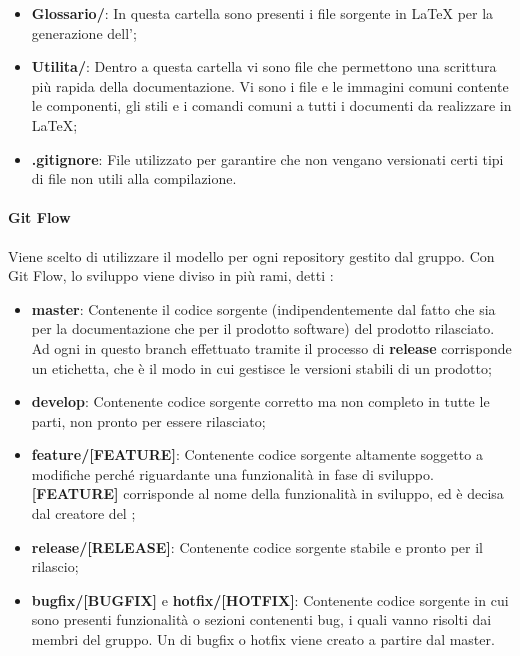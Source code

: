 \begin{itemize}
\begin{itemize}
		Per ogni incontro viene redatto un verbale che è presente in un'unica cartella;
		\item \textbf{StudioDiFattibilita/}: All'interno di questa cartella sono presenti i file sorgente in \LaTeX{} per la generazione dell'\SdF{};
		\item \textbf{NormeDiProgetto/}: Dentro a questa cartella sono presenti i file sorgente in \LaTeX{} per la generazione dell'\NdP{}.
	\end{itemize}	
	\item \textbf{Glossario/}: In questa cartella sono presenti i file sorgente in \LaTeX{} per la generazione dell'\Glossario{};
	\item \textbf{Utilita/}: Dentro a questa cartella vi sono file che permettono una scrittura più rapida della documentazione.
	Vi sono i file e le immagini comuni contente le componenti, gli stili e i comandi comuni a tutti i documenti da realizzare in \LaTeX{};
	\item \textbf{.gitignore}: File utilizzato per garantire che non vengano versionati certi tipi di file non utili alla compilazione.
\end{itemize}

\paragraph{Git Flow}
Viene scelto di utilizzare il modello  per ogni repository gestito dal gruppo.
Con Git Flow, lo sviluppo viene diviso in più rami, detti :
\begin{itemize}
	\item \textbf{master}: Contenente il codice sorgente (indipendentemente dal fatto che sia per la documentazione che per il prodotto software) del prodotto rilasciato.
	Ad ogni  in questo branch effettuato tramite il processo di \textbf{release} corrisponde un etichetta, che è il modo in cui  gestisce le versioni stabili di un prodotto;
	\item \textbf{develop}: Contenente codice sorgente corretto ma non completo in tutte le parti, non pronto per essere rilasciato;
	\item \textbf{feature/[FEATURE]}: Contenente codice sorgente altamente soggetto a modifiche perché riguardante una funzionalità in fase di sviluppo.
	\textbf{[FEATURE]} corrisponde al nome della funzionalità in sviluppo, ed è decisa dal creatore del ;
	\item \textbf{release/[RELEASE]}: Contenente codice sorgente stabile e pronto per il rilascio;
	\item \textbf{bugfix/[BUGFIX]} e \textbf{hotfix/[HOTFIX]}: Contenente codice sorgente in cui sono presenti funzionalità o sezioni contenenti bug, i quali vanno risolti dai membri del gruppo.
	Un  di bugfix o hotfix viene creato a partire dal  master.
\end{itemize}

